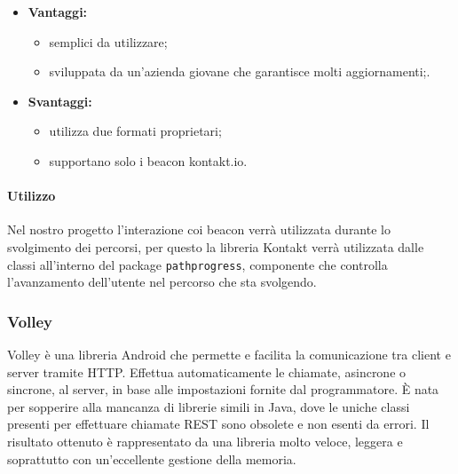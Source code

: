 	\begin{itemize}
		\item \textbf{Vantaggi:}
			\begin{itemize}
				\item semplici da utilizzare;
				\item sviluppata da un'azienda giovane che garantisce molti aggiornamenti;.
			\end{itemize}
		\item \textbf{Svantaggi:}
			\begin{itemize}
				\item utilizza due formati proprietari;
				\item supportano solo i beacon kontakt.io.
			\end{itemize}
	\end{itemize}
	\paragraph{Utilizzo}
	Nel nostro progetto l'interazione coi beacon verrà utilizzata durante lo svolgimento dei percorsi, per questo la libreria Kontakt verrà utilizzata dalle classi all'interno del package \texttt{pathprogress}, componente che controlla l'avanzamento dell'utente nel percorso che sta svolgendo.

\subsubsection{Volley}
Volley è una libreria Android che permette e facilita la comunicazione tra client e server tramite HTTP. Effettua automaticamente le chiamate, asincrone o sincrone, al server, in base alle impostazioni fornite dal programmatore. È nata per sopperire alla mancanza di librerie simili in Java, dove le uniche classi presenti per effettuare chiamate REST sono obsolete e non esenti da errori. Il risultato ottenuto è rappresentato da una libreria molto veloce, leggera e soprattutto con un'eccellente gestione della memoria.

